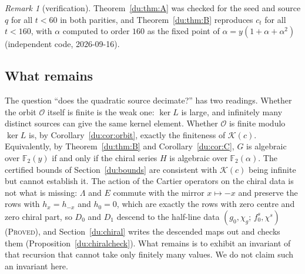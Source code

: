 \documentclass[11pt]{article}
\theoremstyle{definition}
\theoremstyle{remark}
\newtheorem{remark}[theorem]{Remark}
\newcommand{\PROVED}{\textsc{Proved}}
\begin{document}
\begin{remark}[verification]
Theorem~\ref{du:thm:A} was checked for the seed and source $q$ for all $t<60$ in both
parities, and Theorem~\ref{du:thm:B} reproduces $c_t$ for all $t<160$, with $\alpha$
computed to order $160$ as the fixed point of $\alpha = y(1+\alpha+\alpha^2)$
(independent code, 2026-09-16).
\end{remark}

\subsection{What remains}

The question ``does the quadratic source decimate?'' has two readings. Whether the
orbit $\mathcal O$ itself is finite is the weak one: $\ker L$ is large, and
infinitely many distinct sources can give the same kernel element. Whether
$\mathcal O$ is finite modulo $\ker L$ is, by Corollary~\ref{du:cor:orbit}, exactly the
finiteness of $\mathcal K(c)$. Equivalently, by Theorem~\ref{du:thm:B} and
Corollary~\ref{du:cor:C}, $G$ is algebraic over $\mathbb F_2(y)$ if and only if the chiral
series $H$ is algebraic over $\mathbb F_2(\alpha)$. The certified bounds of Section~\ref{du:bounds}
are consistent with $\mathcal K(c)$ being infinite but cannot establish it. The action
of the Cartier operators on the chiral data is not what is missing: $\Lambda$ and $E$ commute with
the mirror $x\mapsto-x$ and preserve the rows with $h_x=h_{-x}$ and $h_0=0$, which are exactly the rows
with zero centre and zero chiral part, so $D_0$ and $D_1$ descend to the half-line data $(g_0,\chi_g;\,f^s_0,\chi^s)$ (\PROVED), and Section~\ref{du:chiral}
writes the descended maps out and checks them (Proposition~\ref{du:chiralcheck}). What remains is to
exhibit an invariant of that recursion that cannot take only finitely many values. We do not
claim such an invariant here.
\end{document}
